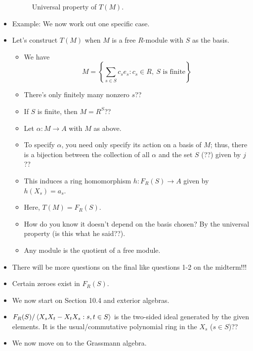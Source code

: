 \documentclass[../notes.tex]{subfiles}
\begin{document}
\begin{itemize}
\begin{figure}[H]
        \caption{Universal property of $T(M)$.}
        \label{fig:univPropTM}
    \end{figure}
    \item Example: We now work out one specific case.
    \item Let's construct $T(M)$ when $M$ is a free $R$-module with $S$ as the basis.
    \begin{itemize}
        \item We have
        \begin{equation*}
            M = \left\{ \sum_{s\in S}c_se_s:c_s\in R,\ S\text{ is finite} \right\}
        \end{equation*}
        \item There's only finitely many nonzero $s$??
        \item If $S$ is finite, then $M=R^S$??
        \item Let $\alpha:M\to A$ with $M$ as above.
        \item To specify $\alpha$, you need only specify its action on a basis of $M$; thus, there is a bijection between the collection of all $\alpha$ and the set $S$ (??) given by $j$??
        \item This induces a ring homomorphism $h:F_R(S)\to A$ given by $h(X_s)=a_s$.
        \item Here, $T(M)=F_R(S)$.
        \item How do you know it doesn't depend on the basis chosen? By the universal property (is this what he said??).
        \item Any module is the quotient of a free module.
    \end{itemize}
    \item There will be more questions on the final like questions 1-2 on the midterm!!!
    \item Certain zeroes exist in $F_R(S)$.
    \item We now start on Section 10.4 and exterior algebras.
    \item $F_R(S)/\left\langle{X_sX_t-X_tX_s:s,t\in S}\right\rangle$ is the two-sided ideal generated by the given elements. It is the usual/commutative polynomial ring in the $X_s$ ($s\in S$)??
    \item We now move on to the Grassmann algebra.

\end{itemize}
\end{document}
